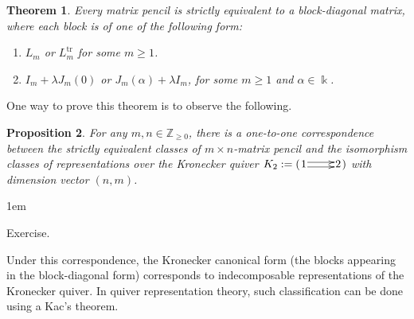 \documentclass[11pt,a4paper]{article}
\makeatletter
\numberwithin{equation}{section}
\renewenvironment{proof}[1][\proofname]{\par
    \pushQED{\qed}%
    \normalfont \topsep0\p@\@plus6\p@ \labelsep1em\relax
    \trivlist
    \item[\hskip\labelsep\indent
        \bfseries #1]\ignorespaces
    \mbox{}
}{
    \popQED\endtrivlist\@endpefalse
}
\theoremstyle{all}
\newtheorem{theorem}{Theorem}[section]
\newtheorem{proposition}[theorem]{Proposition}
\theoremstyle{remark}
\newcommand{\Z}{\mathbb{Z}}
\makeatother
\begin{document}
\begin{theorem}
Every matrix pencil is strictly equivalent to a block-diagonal matrix, where each block is of one of the following form:
\begin{enumerate}
\item $L_m$ or $L_m^{\mathrm{tr}}$ for some $m\ge 1$.

\item $I_m+\lambda J_m(0)$ or $J_m(\alpha)+\lambda I_m$, for some $m\ge 1$ and $\alpha\in \Bbbk$.

\end{enumerate}
\end{theorem}

One way to prove this theorem is to observe the following.

\begin{proposition}
For any $m,n\in \Z_{\ge 0}$, there is a one-to-one correspondence between the strictly equivalent classes of $m\times n$-matrix pencil and the isomorphism classes of representations over the Kronecker quiver $K_2:=(\xymatrix@1{1\ar@<.5ex>[r]\ar@<-.5ex>[r]&2})$ with dimension vector $(n,m)$.
\end{proposition}
\begin{proof}
Exercise.
\end{proof}

Under this correspondence, the Kronecker canonical form (the blocks appearing in the block-diagonal form) corresponds to indecomposable representations of the Kronecker quiver.  
In quiver representation theory, such classification can be done using a Kac's theorem.
\end{document}

